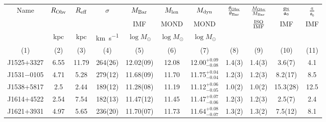\documentclass[fleqn,usenatbib,useAMS]{mnras}
\begin{document}
    \begin{table*}
        \contcaption{}
    \centering
    \tabcolsep=4pt
    \setlength{\extrarowheight}{3pt}
        \begin{tabular}{
        c
        S[table-figures-integer=1,table-figures-decimal=2]
        S[table-figures-integer=2,table-figures-decimal=2]
        S[table-figures-decimal=0,separate-uncertainty,table-figures-uncertainty=1]
        S[separate-uncertainty,table-figures-uncertainty=1]
        S[table-figures-integer=2,table-figures-decimal=2]
        c
        S[table-figures-decimal=1,separate-uncertainty,table-figures-uncertainty=1]
        S[table-figures-decimal=1,separate-uncertainty,table-figures-uncertainty=1]
        S[table-figures-decimal=1,separate-uncertainty,table-figures-uncertainty=1]
        S[table-figures-integer=1,table-figures-decimal=1]
        }
        \hline
        {Name} & {$R_{\rm Obv}$} & {$R_{\rm eff}$} & {$\sigma$} & {$M_{\rm Bar}$} & {$M_{\rm len}$} & {$M_{\rm dyn}$} &	 {$\frac{\theta_{\rm Obv}}{\theta_{\rm Bar}}$} & {$\frac{M_{\rm Obv}}{M_{\rm Bar}}$} & {$\frac{g_{\rm N}}{\mathfrak{a}_0}$} & {$\frac{a}{\mathfrak{a}_0}$} \\
         & & &	& {\footnotesize{IMF}} & {\footnotesize{MOND}} & {\footnotesize{MOND}} & & {\footnotesize{$\frac{\rm ISO}{\rm IMF}$}} & {\footnotesize{IMF}} & {\footnotesize{IMF}} \\
         &	{kpc} &{kpc} & {\si{\kilo\metre\per\second}} & {\footnotesize{$\log{M}_{\odot}$}} & {\footnotesize{$\log{M}_{\odot}$}} & {\footnotesize{$\log{M}_{\odot}$}} & & & & \\
        {(1)} & {(2)} & {(3)} & {(4)} &{(5)} & {(6)} & {(7)} & {(8)} & {(9)} & {(10)} & {(11)}  \\						  				
        \hline
        J1525$+$3327&	6.55 &11.79	& 264(26) &	12.02(09) &	12.08 & 12.00$^{+0.09}_{-0.08}$ & 1.4(3) & 1.4(3) & 3.6(7) & 4.1 \\
        J1531$-$0105&	4.71 & 5.28	& 279(12) &	11.68(09) &	11.70 & 11.75$^{+0.04}_{-0.04}$ & 1.2(3) & 1.2(3) & 8.2(17) & 8.5 \\
        J1538$+$5817&	2.5	 & 2.44	& 189(12) &	11.28(08) &	11.19 & 11.12$^{+0.06}_{-0.05}$ & 1.0(2) & 1.0(2) & 15.3(28) & 12.5 \\
        J1614$+$4522&	2.54 & 7.54	& 182(13) &	11.47(12) &	11.45 & 11.47$^{+0.07}_{-0.06}$ & 1.2(3) & 1.2(3) & 2.5(7) & 2.4 \\
        J1621$+$3931&	4.97 & 5.65	& 236(20) &	11.70(07) &	11.73 & 11.64$^{+0.08}_{-0.07}$ & 1.3(2) & 1.3(2) & 7.5(12) & 8.1 \\

\end{tabular}
\end{table*}
\end{document}
